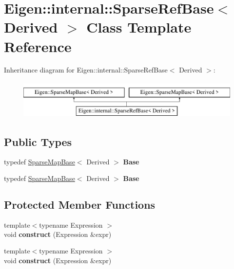 \hypertarget{class_eigen_1_1internal_1_1_sparse_ref_base}{}\section{Eigen\+:\+:internal\+:\+:Sparse\+Ref\+Base$<$ Derived $>$ Class Template Reference}
\label{class_eigen_1_1internal_1_1_sparse_ref_base}
Inheritance diagram for Eigen\+:\+:internal\+:\+:Sparse\+Ref\+Base$<$ Derived $>$\+:\begin{figure}[H]
\begin{center}
\leavevmode
\includegraphics[height=2.000000cm]{class_eigen_1_1internal_1_1_sparse_ref_base}
\end{center}
\end{figure}
\subsection*{Public Types}
\begin{DoxyCompactItemize}
\item 
\mbox{\label{class_eigen_1_1internal_1_1_sparse_ref_base_a13de1d6877d45d0a108d02e8059924dd}} 
typedef \hyperlink{class_eigen_1_1_sparse_map_base}{Sparse\+Map\+Base}$<$ Derived $>$ {\bfseries Base}
\item 
\mbox{\label{class_eigen_1_1internal_1_1_sparse_ref_base_a13de1d6877d45d0a108d02e8059924dd}} 
typedef \hyperlink{class_eigen_1_1_sparse_map_base}{Sparse\+Map\+Base}$<$ Derived $>$ {\bfseries Base}
\end{DoxyCompactItemize}
\subsection*{Protected Member Functions}
\begin{DoxyCompactItemize}
\item 
\mbox{\label{class_eigen_1_1internal_1_1_sparse_ref_base_a250b1b345c644eefaa493d17490c42fe}} 
{\footnotesize template$<$typename Expression $>$ }\\void {\bfseries construct} (Expression \&expr)
\item 
\mbox{\label{class_eigen_1_1internal_1_1_sparse_ref_base_a250b1b345c644eefaa493d17490c42fe}} 
{\footnotesize template$<$typename Expression $>$ }\\void {\bfseries construct} (Expression \&expr)
\end{DoxyCompactItemize}


